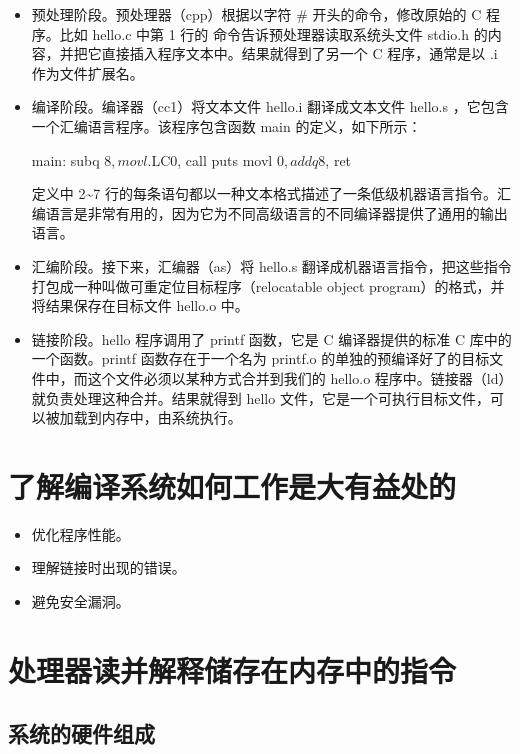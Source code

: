 \begin{itemize}
    \item 预处理阶段。预处理器（cpp）根据以字符 \# 开头的命令，修改原始的 C 程序。比如 hello.c 中第 1 行的  命令告诉预处理器读取系统头文件 stdio.h 的内容，并把它直接插入程序文本中。结果就得到了另一个 C 程序，通常是以 .i 作为文件扩展名。
    \item 编译阶段。编译器（cc1）将文本文件 hello.i 翻译成文本文件 hello.s ，它包含一个汇编语言程序。该程序包含函数 main 的定义，如下所示：
    \begin{gascode}
    main:
        subq $8, %
        movl $.LC0, %
        call puts
        movl $0, %
        addq $8, %
        ret
    \end{gascode}
    定义中 2\~{}7 行的每条语句都以一种文本格式描述了一条低级机器语言指令。汇编语言是非常有用的，因为它为不同高级语言的不同编译器提供了通用的输出语言。
    \item 汇编阶段。接下来，汇编器（as）将 hello.s 翻译成机器语言指令，把这些指令打包成一种叫做可重定位目标程序（relocatable object program）的格式，并将结果保存在目标文件 hello.o 中。
    \item 链接阶段。hello 程序调用了 printf 函数，它是 C 编译器提供的标准 C 库中的一个函数。printf 函数存在于一个名为 printf.o 的单独的预编译好了的目标文件中，而这个文件必须以某种方式合并到我们的 hello.o 程序中。链接器（ld）就负责处理这种合并。结果就得到 hello 文件，它是一个可执行目标文件，可以被加载到内存中，由系统执行。
\end{itemize}

\section{了解编译系统如何工作是大有益处的}

\begin{itemize}
    \item 优化程序性能。
    \item 理解链接时出现的错误。
    \item 避免安全漏洞。
\end{itemize}

\section{处理器读并解释储存在内存中的指令}

\subsection{系统的硬件组成}

